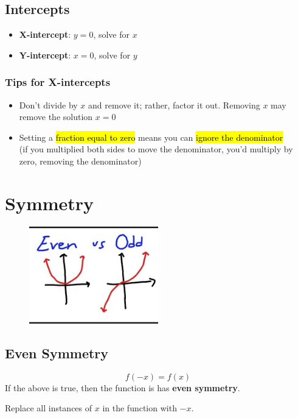\documentclass[a4paper,12pt]{article}
\begin{document}
\subsection{Intercepts}
\begin{itemize}
    \item{\textbf{X-intercept}: $y = 0$, solve for $x$}
    \item{\textbf{Y-intercept}: $x = 0$, solve for $y$}
\end{itemize}

\subsubsection{Tips for X-intercepts}
\begin{itemize}
    \item{Don't divide by $x$ and remove it; rather, factor it out. Removing $x$ may remove the solution $x=0$}
    \item{Setting a \hl{fraction equal to zero} means you can \hl{ignore the denominator}\\(if you multiplied both sides to move the denominator, you'd multiply by zero, removing the denominator)}
\end{itemize}

\pagebreak

\section{Symmetry}
\begin{figure}[H]
    \centering
    \includegraphics[width=0.50\textwidth]{evenodd}
\end{figure}
\subsection{Even Symmetry}
$$f(-x) = f(x)$$
If the above is true, then the function is has \textbf{even symmetry}.

Replace all instances of $x$ in the function with $-x$. 
\end{document}
